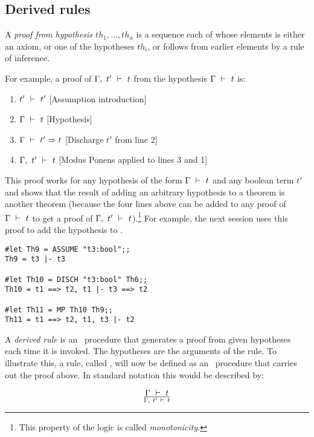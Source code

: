 \subsection{Derived rules}


A {\it proof from hypothesis $th_1, \ldots, th_n$} is a sequence each of whose
elements is either an axiom, or one of the hypotheses $th_i$, or follows from
earlier elements by a rule of inference.

For example, a proof of $\Gamma,\ t'\ \vdash\  t$ from the hypothesis
$\Gamma\ \vdash\  t$ is:


\begin{enumerate}
\item $t'\ \vdash\  t'$ \hfill [Assumption introduction]
\item $\Gamma\ \vdash\  t$ \hfill [Hypothesis]
\item $\Gamma\ \vdash\  t'\Rightarrow t$ \hfill [Discharge $t'$ from line 2]
\item $\Gamma,\ t'\ \vdash\  t$ \hfill [Modus Ponens applied to lines 3 and 1]
\end{enumerate}

\noindent This proof works for any hypothesis of the form $\Gamma\ \vdash\  t$
and any boolean term $t'$ and
shows that the result of adding an arbitrary hypothesis to a theorem is another
theorem (because the four lines above can be added to any proof of
$\Gamma\ \vdash\  t$ to get a proof of $\Gamma,\ t'\ \vdash\  t$).\footnote{This property
of the logic is called {\it monotonicity}.} For example,
the next session uses this proof to add the hypothesis  to
.

\begin{session}\begin{verbatim}
#let Th9 = ASSUME "t3:bool";;
Th9 = t3 |- t3

#let Th10 = DISCH "t3:bool" Th6;;
Th10 = t1 ==> t2, t1 |- t3 ==> t2

#let Th11 = MP Th10 Th9;;
Th11 = t1 ==> t2, t1, t3 |- t2
\end{verbatim}\end{session}


A {\it derived rule\/} is an \ML\ procedure that generates a proof from given hypotheses
each time it is invoked. The hypotheses are the arguments of the rule.
To illustrate this, a rule, called , will now
be defined as an \ML\ procedure that carries
out the proof above. In standard notation this would be described by:

\[ \Gamma\ \vdash\  t\over \Gamma,\ t'\ \vdash\  t \]

